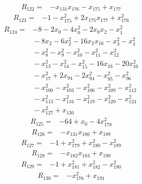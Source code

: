 {\begin{align*}
\end{align*}
\begin{align*}
R_{122} ={}& -x_{131} x_{176} - x_{175} + x_{177}
\end{align*}
\begin{align*}
R_{123} ={}& -1 - x_{175}^{2} + 2x_{175} x_{177} + x_{176}^{2}
\end{align*}
\begin{align*}
R_{124} ={}& -8 - 2x_{0} - 4x_{0}^{2} - 2x_{0} x_{2} - x_{1}^{2} \\
&{}  - 8x_{2} - 6x_{2}^{2} - 16x_{2} x_{16} - x_{3}^{2} - x_{4}^{2} \\
&{}  - x_{8}^{2} - x_{9}^{2} - x_{10}^{2} - x_{11}^{2} - x_{12}^{2} \\
&{}  - x_{13}^{2} - x_{14}^{2} - x_{15}^{2} - 16x_{16} - 20x_{16}^{2} \\
&{}  - x_{17}^{2} + 2x_{94} - 2x_{94}^{2} - x_{95}^{2} - x_{96}^{2} \\
&{}  - x_{100}^{2} - x_{103}^{2} - x_{106}^{2} - x_{109}^{2} - x_{112}^{2} \\
&{}  - x_{113}^{2} - x_{116}^{2} - x_{119}^{2} - x_{120}^{2} - x_{124}^{2} \\
&{}  - x_{127}^{2} + x_{130}
\end{align*}
\begin{align*}
R_{125} ={}& -64 + x_{0} - 4x_{178}^{2}
\end{align*}
\begin{align*}
R_{126} ={}& -x_{131} x_{180} + x_{189}
\end{align*}
\begin{align*}
R_{127} ={}& -1 + x_{179}^{2} + x_{180}^{2} - x_{189}^{2}
\end{align*}
\begin{align*}
R_{128} ={}& -x_{182} x_{183} + x_{190}
\end{align*}
\begin{align*}
R_{129} ={}& -1 + x_{181}^{2} + x_{182}^{2} - x_{190}^{2}
\end{align*}
\begin{align*}
R_{130} ={}& -x_{176}^{2} + x_{191}
\end{align*}
}
